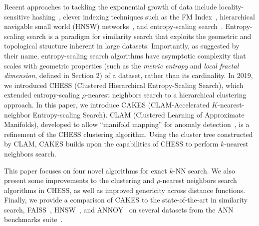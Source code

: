 Recent approaches to tackling the exponential growth of data include locality-sensitive hashing~\cite{indyk1999sublinear}, clever indexing techniques such as the FM Index~\cite{simpson2010efficient}, hierarchical navigable small world (HNSW) networks~\cite{Malkov2016EfficientAR}, and entropy-scaling search~\cite{yu2015entropy, ishaq2019clustered}.
Entropy-scaling search is a paradigm for similarity search that exploits the geometric and topological structure inherent in large datasets.
Importantly, as suggested by their name, entropy-scaling search algorithms have asymptotic complexity that scales with geometric properties (such as the \emph{metric entropy} and \emph{local fractal dimension}, defined in Section 2) of a dataset, rather than its cardinality.
In 2019, we introduced CHESS (Clustered Hierarchical Entropy-Scaling Search), which extended entropy-scaling $\rho$-nearest neighbors search to a hierarchical clustering approach.
In this paper, we introduce CAKES (CLAM-Accelerated $K$-nearest-neighbor Entropy-scaling Search).
CLAM (Clustered Learning of Approximate Manifolds), developed to allow ``manifold mapping'' for anomaly detection~\cite{ishaq2021clustered}, is a refinement of the CHESS clustering algorithm. 
Using the cluster tree constructed by CLAM, CAKES builds upon the capabilities of CHESS to perform $k$-nearest neighbors search.

This paper focuses on four novel algorithms for exact $k$-NN search.
We also present some improvements to the clustering and $\rho$-nearest neighbors search algorithms in CHESS, as well as improved genericity across distance functions.
Finally, we provide a comparison of CAKES to the state-of-the-art in similarity search, FAISS~\cite{johnson2019billion}, HNSW~\cite{malkov2016hnsw}, and ANNOY~\cite{annoy} on several datasets from the ANN benchmarks suite~\cite{aumuller2020ann}.
